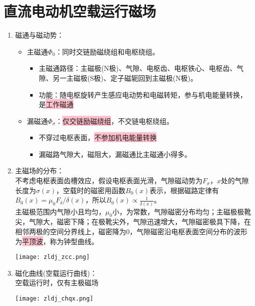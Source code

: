 \documentclass[blue]{elegantnote}
\begin{document}
\section{直流电动机空载运行磁场}
\begin{enumerate}
	\item 磁通与磁动势：
	\begin{itemize}
		\item 主磁通$\Phi_0$：同时交链励磁绕组和电枢绕组。
		\begin{itemize}
			\item 主磁通路径：主磁极(N极)、气隙、电枢齿、电枢铁心、电枢齿、气隙、另一主磁极(S极)、定子磁轭回到主磁极(N极)。
			\item 功能：随电枢旋转产生感应电动势和电磁转矩，参与机电能量转换，是\colorbox{pink}{工作磁通}
		\end{itemize}
		\item 漏磁通$\Phi_{\sigma}$：\colorbox{pink}{仅交链励磁绕组}，不交链电枢绕组。
		\begin{itemize}
			\item 不穿过电枢表面，\colorbox{pink}{不参加机电能量转换}
			\item 漏磁路气隙大，磁阻大，漏磁通比主磁通小得多。
		\end{itemize}
	\end{itemize}
	\item	主磁场的分布：\\
	不考虑电枢表面齿槽效应，假设电枢表面光滑，气隙磁动势为$F_{\sigma}$，$x$处的气隙长度为$\sigma(x)$，空载时的磁密用函数$B_{0}(x)$表示，根据磁路定律有$B_{0}(x)=\mu _{0}F_{\delta}/\delta(x)$，所以$B_{0}(x)\propto \frac{1}{\delta(x)}$。\\
	主磁极范围内气隙小且均匀，$\mu_0$小，为常数，气隙磁密分布均匀；主磁极极靴尖，气隙大，磁密下降；在极靴尖外，气隙迅速增大，气隙磁密极具下降，在相邻两极的空间分界线上，磁密降为0，气隙磁密沿电枢表面空间分布的波形为\colorbox{pink}{平顶波}，称为钟型曲线。
	\begin{center}
		\texttt{[image: zldj\_zcc.png]}
	\end{center}
	\item 磁化曲线(空载运行曲线)：\\
	空载运行时，仅有主极磁场
	\begin{center}
		\texttt{[image: zldj\_chqx.png]}
	\end{center}
\end{enumerate}
\end{document}
